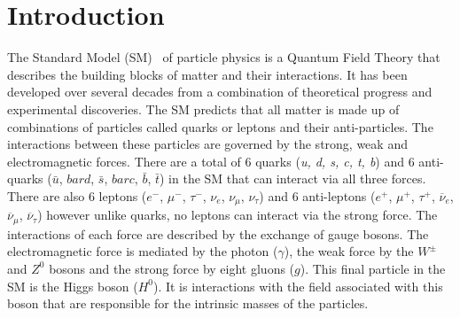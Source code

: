 \chapter{Introduction}
\label{sec:intro}


The Standard Model (SM)~\cite{GLASHOW1961579,PhysRevLett.19.1264,PhysRevD.2.1285} of particle physics is a Quantum Field Theory that describes the building blocks of matter and their interactions. It has been developed over several decades from a combination of theoretical progress and experimental discoveries. 
The SM predicts that all matter is made up of combinations of particles called quarks or leptons and their anti-particles. The interactions between these particles are governed by the strong, weak and electromagnetic forces. 
There are a total of 6 quarks ({\it u, d, s, c, t, b}) and 6 anti-quarks ($\bar{u}$, $bar{d}$, $\bar{s}$, $bar{c}$, $\bar{b}$, $\bar{t}$) in the SM that can interact via all three forces. There are also 6 leptons ($e^{-}$, $\mu^{-}$, $\tau^{-}$, $\nu_e$, $\nu_{\mu}$, $\nu_{\tau}$) and 6 anti-leptons ($e^{+}$, $\mu^{+}$, $\tau^{+}$, $\overline{\nu}_e$, $\overline{\nu}_{\mu}$, $\overline{\nu}_{\tau}$) however unlike quarks, no leptons can interact via the strong force.
The interactions of each force are described by the exchange of gauge bosons. The electromagnetic force is mediated by the photon ($\gamma$), the weak force by the $W^{\pm}$ and $Z^0$ bosons and the strong force by eight gluons ($g$). 
This final particle in the SM is the Higgs boson ($H^0$). It is interactions with the field associated with this boson that are responsible for the intrinsic masses of the particles.  




